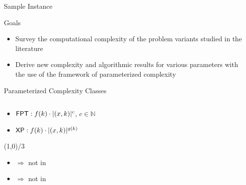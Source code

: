 \begin{frame}{Sample Instance}
    
\end{frame}

\begin{frame}{Goals}
    \begin{itemize}
        \item Survey the computational complexity of the problem variants studied in the literature
        \item Derive new complexity and algorithmic results for various parameters
        with the use of the framework of parameterized complexity
    \end{itemize}
\end{frame}

\begin{frame}{Parameterized Complexity Classes}
    \begin{columns}
        \begin{column}{0.39\textwidth}
            \begin{itemize}
                \item $\textsf{FPT}: f(k) \cdot |(x,k)|^c$, $c \in \mathbb{N}$
                \item $\textsf{XP}: f(k) \cdot |(x,k)|^{g(k)}$
            \end{itemize}

            \begin{center}
                \line(1,0){\textwidth/3}
            \end{center}

            \begin{itemize}
                \item \Wh $\Rightarrow$ not in \FPT
                \item \pNPh $\Rightarrow$ not in \XP
            \end{itemize}
        \end{column}
    
        \begin{column}{0.69\textwidth}
              
        \end{column}
      \end{columns}
\end{frame}
